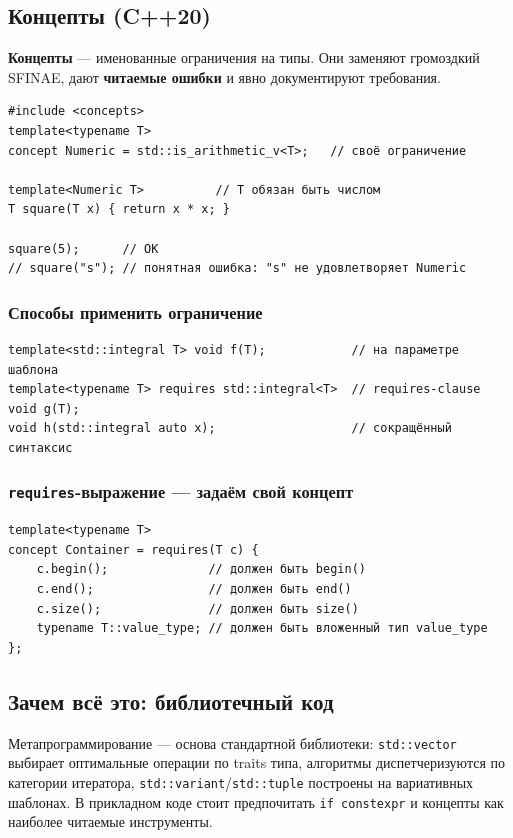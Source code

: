 \subsection{Концепты (C++20)}

\textbf{Концепты} --- именованные ограничения на типы. Они заменяют громоздкий
SFINAE, дают \textbf{читаемые ошибки} и явно документируют требования.

\begin{lstlisting}
#include <concepts>
template<typename T>
concept Numeric = std::is_arithmetic_v<T>;   // своё ограничение

template<Numeric T>          // T обязан быть числом
T square(T x) { return x * x; }

square(5);      // OK
// square("s"); // понятная ошибка: "s" не удовлетворяет Numeric
\end{lstlisting}

\subsubsection{Способы применить ограничение}

\begin{lstlisting}
template<std::integral T> void f(T);            // на параметре шаблона
template<typename T> requires std::integral<T>  // requires-clause
void g(T);
void h(std::integral auto x);                   // сокращённый синтаксис
\end{lstlisting}

\subsubsection{\texttt{requires}-выражение --- задаём свой концепт}

\begin{lstlisting}
template<typename T>
concept Container = requires(T c) {
    c.begin();              // должен быть begin()
    c.end();                // должен быть end()
    c.size();               // должен быть size()
    typename T::value_type; // должен быть вложенный тип value_type
};
\end{lstlisting}

\subsection{Зачем всё это: библиотечный код}

Метапрограммирование --- основа стандартной библиотеки: \texttt{std::vector}
выбирает оптимальные операции по traits типа, алгоритмы диспетчеризуются по
категории итератора, \texttt{std::variant}/\texttt{std::tuple} построены на
вариативных шаблонах. В прикладном коде стоит предпочитать \texttt{if constexpr}
и концепты как наиболее читаемые инструменты.
